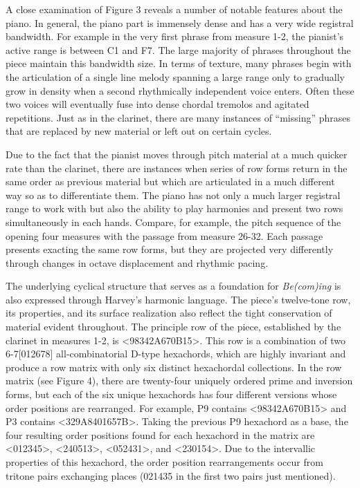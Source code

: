 A close examination of Figure 3 reveals a number of notable features about the piano. In general, the piano part is immensely dense and has a very wide registral bandwidth. For example in the very first phrase from measure 1-2, the pianist's active range is between C1 and F7. The large majority of phrases throughout the piece maintain this bandwidth size. In terms of texture, many phrases begin with the articulation of a single line melody spanning a large range only to gradually grow in density when a second rhythmically independent voice enters. Often these two voices will eventually fuse into dense chordal tremolos and agitated repetitions. Just as in the clarinet, there are many instances of ``missing'' phrases that are replaced by new material or left out on certain cycles.

Due to the fact that the pianist moves through pitch material at a much quicker rate than the clarinet, there are instances when series of row forms return in the same order as previous material but which are articulated in a much different way so as to differentiate them. The piano has not only a much larger registral range to work with but also the ability to play harmonies and present two rows simultaneously in each hands. Compare, for example, the pitch sequence of the opening four measures with the passage from measure 26-32. Each passage presents exacting the same row forms, but they are projected very differently through changes in octave displacement and rhythmic pacing.

The underlying cyclical structure that serves as a foundation for \emph{Be(com)ing} is also expressed through Harvey's harmonic language. The piece's twelve-tone row, its properties, and its surface realization also reflect the tight conservation of material evident throughout. The principle row of the piece, established by the clarinet in measures 1-2, is <98342A670B15>. This row is a combination of two 6-7[012678] all-combinatorial D-type hexachords, which are highly invariant and produce a row matrix with only six distinct hexachordal collections. In the row matrix (see Figure 4), there are twenty-four uniquely ordered prime and inversion forms, but each of the six unique hexachords has four different versions whose order positions are rearranged. For example, P9 contains <98342A670B15> and P3 contains <329A8401657B>. Taking the previous P9 hexachord as a base, the four resulting order positions found for each hexachord in the matrix are <012345>, <240513>, <052431>, and <230154>. Due to the intervallic properties of this hexachord, the order position rearrangements occur from tritone pairs exchanging places ({02}{14}{35} in the first two pairs just mentioned).


